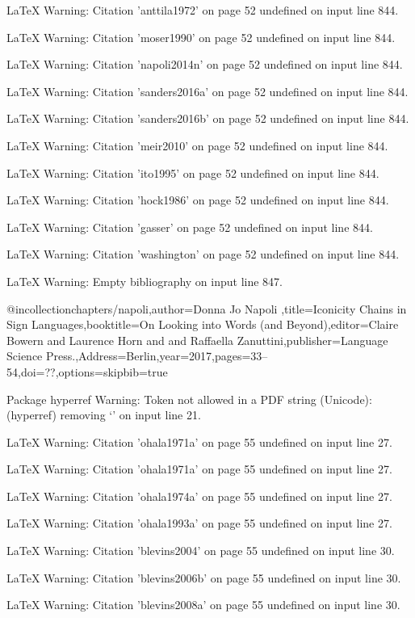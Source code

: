 LaTeX Warning: Citation 'anttila1972' on page 52 undefined on input line 844.


LaTeX Warning: Citation 'moser1990' on page 52 undefined on input line 844.


LaTeX Warning: Citation 'napoli2014n' on page 52 undefined on input line 844.


LaTeX Warning: Citation 'sanders2016a' on page 52 undefined on input line 844.


LaTeX Warning: Citation 'sanders2016b' on page 52 undefined on input line 844.


LaTeX Warning: Citation 'meir2010' on page 52 undefined on input line 844.


LaTeX Warning: Citation 'ito1995' on page 52 undefined on input line 844.


LaTeX Warning: Citation 'hock1986' on page 52 undefined on input line 844.


LaTeX Warning: Citation 'gasser' on page 52 undefined on input line 844.


LaTeX Warning: Citation 'washington' on page 52 undefined on input line 844.


LaTeX Warning: Empty bibliography on input line 847.

@incollection{chapters/napoli,author={Donna Jo Napoli },title={{Iconicity Chains in Sign Languages}},booktitle={{On Looking into Words (and Beyond)}},editor={Claire Bowern and  Laurence Horn and  and Raffaella Zanuttini},publisher={Language Science Press.},Address={Berlin},year=2017,pages={33--54},doi={??},options={skipbib=true}}

Package hyperref Warning: Token not allowed in a PDF string (Unicode):
(hyperref)                removing `\newline' on input line 21.


LaTeX Warning: Citation 'ohala1971a' on page 55 undefined on input line 27.


LaTeX Warning: Citation 'ohala1971a' on page 55 undefined on input line 27.


LaTeX Warning: Citation 'ohala1974a' on page 55 undefined on input line 27.


LaTeX Warning: Citation 'ohala1993a' on page 55 undefined on input line 27.


LaTeX Warning: Citation 'blevins2004' on page 55 undefined on input line 30.


LaTeX Warning: Citation 'blevins2006b' on page 55 undefined on input line 30.


LaTeX Warning: Citation 'blevins2008a' on page 55 undefined on input line 30.


